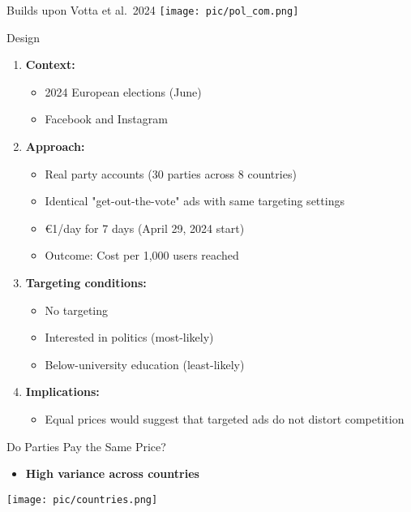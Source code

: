 \documentclass[
  ignorenonframetext,
]{beamer}
\begin{document}
\begin{frame}{Builds upon Votta et al.~2024}
\label{builds-upon-votta-et-al.-2024}
\texttt{[image: pic/pol\_com.png]}
\end{frame}

\begin{frame}{Design}
\label{design}
\begin{enumerate}
  \item \textbf{Context:}
    \begin{itemize}
      \item 2024 European elections (June)
      \item Facebook and Instagram
    \end{itemize}
    \vspace{.2cm}
    \pause

  \item \textbf{Approach:}
    \begin{itemize}
      \item Real party accounts (30 parties across 8 countries)
      \item Identical "get-out-the-vote" ads with same targeting settings
      \item €1/day for 7 days (April 29, 2024 start)
      \item Outcome: Cost per 1,000 users reached
    \end{itemize}
    \vspace{.2cm}
    \pause

  \item \textbf{Targeting conditions:}
    \begin{itemize}
      \item No targeting
      \item Interested in politics (most-likely)
      \item Below-university education (least-likely)
    \end{itemize}
    \vspace{.2cm}
    \pause

  \item \textbf{Implications:}
    \begin{itemize}
      \item Equal prices would suggest that targeted ads do not distort competition
    \end{itemize}
\end{enumerate}
\end{frame}

\begin{frame}{Do Parties Pay the Same Price?}
\label{do-parties-pay-the-same-price}
\begin{itemize}
  \item \textbf{High variance across countries}
\end{itemize}

\begin{center}
    \texttt{[image: pic/countries.png]}
\end{center}
\end{frame}
\end{document}
